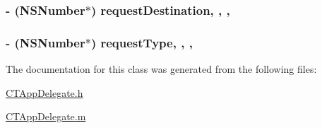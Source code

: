 \hypertarget{interface_c_t_app_delegate_a91630675dd1cdd1844fdd217ce52bf86}{
\subsubsection[{request\-Destination}]{\setlength{\rightskip}{0pt plus 5cm}-\/ (N\-S\-Number$\ast$) request\-Destination\hspace{0.3cm}{\ttfamily [read]}, {\ttfamily [write]}, {\ttfamily [atomic]}, {\ttfamily [copy]}}}\label{interface_c_t_app_delegate_a91630675dd1cdd1844fdd217ce52bf86}
\hypertarget{interface_c_t_app_delegate_ae0366c6888903dc8247ecf1f2dacc69d}{
\subsubsection[{request\-Type}]{\setlength{\rightskip}{0pt plus 5cm}-\/ (N\-S\-Number$\ast$) request\-Type\hspace{0.3cm}{\ttfamily [read]}, {\ttfamily [write]}, {\ttfamily [atomic]}, {\ttfamily [copy]}}}\label{interface_c_t_app_delegate_ae0366c6888903dc8247ecf1f2dacc69d}


The documentation for this class was generated from the following files\-:\begin{DoxyCompactItemize}
\item 
\hyperlink{_c_t_app_delegate_8h}{C\-T\-App\-Delegate.\-h}\item 
\hyperlink{_c_t_app_delegate_8m}{C\-T\-App\-Delegate.\-m}\end{DoxyCompactItemize}
